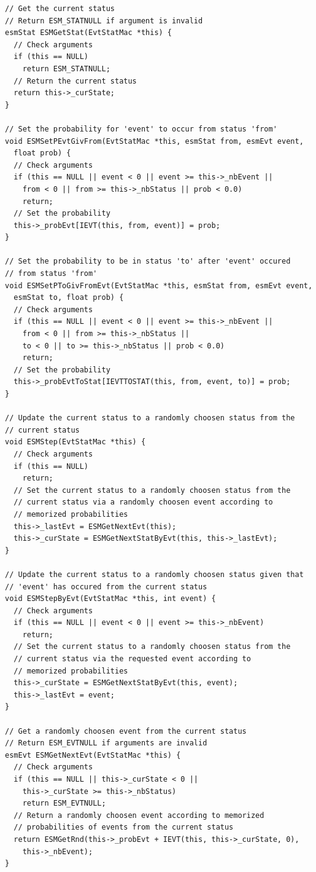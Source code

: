 \documentclass[12pt, a4paper]{article}
\begin{document}
\begin{scriptsize}
\begin{ttfamily}
\begin{lstlisting}
// Get the current status
// Return ESM_STATNULL if argument is invalid
esmStat ESMGetStat(EvtStatMac *this) {
  // Check arguments
  if (this == NULL) 
    return ESM_STATNULL;
  // Return the current status
  return this->_curState;  
}

// Set the probability for 'event' to occur from status 'from'
void ESMSetPEvtGivFrom(EvtStatMac *this, esmStat from, esmEvt event, 
  float prob) {
  // Check arguments
  if (this == NULL || event < 0 || event >= this->_nbEvent ||
    from < 0 || from >= this->_nbStatus || prob < 0.0) 
    return;
  // Set the probability
  this->_probEvt[IEVT(this, from, event)] = prob;
}

// Set the probability to be in status 'to' after 'event' occured 
// from status 'from'
void ESMSetPToGivFromEvt(EvtStatMac *this, esmStat from, esmEvt event, 
  esmStat to, float prob) {
  // Check arguments
  if (this == NULL || event < 0 || event >= this->_nbEvent ||
    from < 0 || from >= this->_nbStatus ||
    to < 0 || to >= this->_nbStatus || prob < 0.0) 
    return;
  // Set the probability
  this->_probEvtToStat[IEVTTOSTAT(this, from, event, to)] = prob;
}

// Update the current status to a randomly choosen status from the
// current status
void ESMStep(EvtStatMac *this) {
  // Check arguments
  if (this == NULL) 
    return;
  // Set the current status to a randomly choosen status from the 
  // current status via a randomly choosen event according to 
  // memorized probabilities
  this->_lastEvt = ESMGetNextEvt(this);
  this->_curState = ESMGetNextStatByEvt(this, this->_lastEvt);
}

// Update the current status to a randomly choosen status given that 
// 'event' has occured from the current status
void ESMStepByEvt(EvtStatMac *this, int event) {
  // Check arguments
  if (this == NULL || event < 0 || event >= this->_nbEvent) 
    return;
  // Set the current status to a randomly choosen status from the 
  // current status via the requested event according to 
  // memorized probabilities
  this->_curState = ESMGetNextStatByEvt(this, event);
  this->_lastEvt = event;
}

// Get a randomly choosen event from the current status 
// Return ESM_EVTNULL if arguments are invalid
esmEvt ESMGetNextEvt(EvtStatMac *this) {
  // Check arguments
  if (this == NULL || this->_curState < 0 || 
    this->_curState >= this->_nbStatus) 
    return ESM_EVTNULL;
  // Return a randomly choosen event according to memorized 
  // probabilities of events from the current status
  return ESMGetRnd(this->_probEvt + IEVT(this, this->_curState, 0), 
    this->_nbEvent);
}


\end{lstlisting}
\end{ttfamily}
\end{scriptsize}
\end{document}
